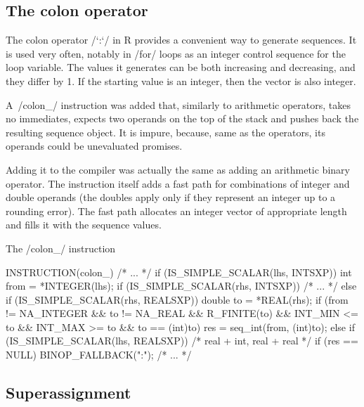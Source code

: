 
\subsection{The colon operator}

The colon operator \rinline/`:`/ in R provides a convenient way to generate sequences. It is used very often, notably in \rinline/for/ loops as an integer control sequence for the loop variable. The values it generates can be both increasing and decreasing, and they differ by 1. If the starting value is an integer, then the vector is also integer.

A~\cinline/colon_/ instruction was added that, similarly to arithmetic operators, takes no immediates, expects two operands on the top of the stack and pushes back the resulting sequence object. It is impure, because, same as the operators, its operands could be unevaluated promises.

Adding it to the compiler was actually the same as adding an arithmetic binary operator. The instruction itself adds a fast path for combinations of integer and double operands (the doubles apply only if they represent an integer up to a rounding error). The fast path allocates an integer vector of appropriate length and fills it with the sequence values.

\begin{listing}[htbp]
  \caption{\label{lst:colon}The \cinline/colon_/ instruction}
  \begin{ccode}
INSTRUCTION(colon_) {
    /* ... */
    if (IS_SIMPLE_SCALAR(lhs, INTSXP)) {
        int from = *INTEGER(lhs);
        if (IS_SIMPLE_SCALAR(rhs, INTSXP)) {
            /* ... */
        } else if (IS_SIMPLE_SCALAR(rhs, REALSXP)) {
            double to = *REAL(rhs);
            if (from != NA_INTEGER && to != NA_REAL &&
                    R_FINITE(to) && INT_MIN <= to &&
                    INT_MAX >= to && to == (int)to) {
                res = seq_int(from, (int)to);
            }
        }
    } else if (IS_SIMPLE_SCALAR(lhs, REALSXP)) {
        /* real + int, real + real */
    }
    if (res == NULL) {
        BINOP_FALLBACK(":");
    }
    /* ... */
}
  \end{ccode}
\end{listing}


\subsection{Superassignment}

